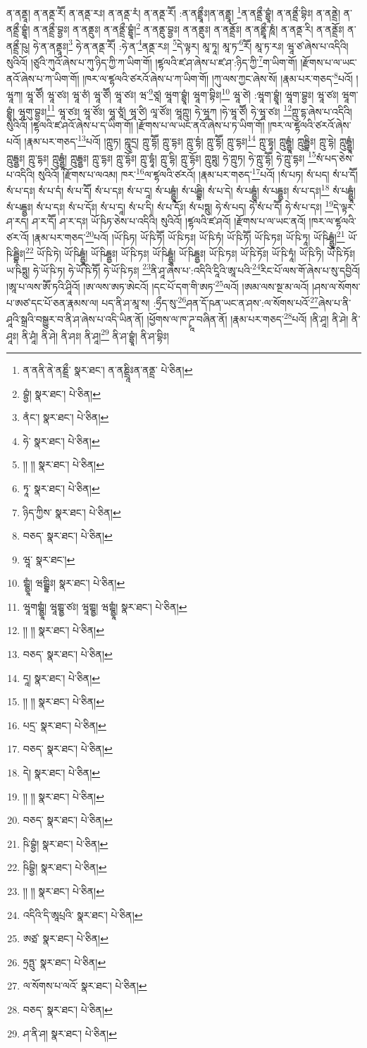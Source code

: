 ན་ནནྡཱ། ན་ནནྡ་རཽ། ན་ནནྡ་རཿ། ན་ནནྡ་རཾ། ན་ནནྡ་རཽ། :ན་ནནྡྲཱྀཿ།ན་ནནྡྲཱ། \footnote{ན་ནནི་ནེ་ནཎྡྲྀ་  སྣར་ཐང་། ན་ནཎྡྲཱིཿན་ནནྡྲ་  པེ་ཅིན། }ན་ནནྡྲྀ་བྷྱཱཾ། ན་ནནྡྲྀ་བྷིཿ། ན་ནནྡྲེ། ན་ནནྡྲྀ་བྷྱཱཾ། ན་ནནྡྲྀ་བྷྱཿ། ན་ནནྡུཿ། ན་ནནྡྲྀ་བྷྱཱཾ།\footnote{བྷྱཾ།  སྣར་ཐང་།  པེ་ཅིན། } ན་ནནྡུ་བྷྱཿ། ན་ནནྡུཿ། ན་ནནྡྲོཿ། ན་ནནྡྲཱྀ་ཎཱཾ། ན་ནནྡ་རི། ན་ནནྡྲོཿ། ན་ནནྡྲྀ་ཥུ། ཧེ་ན་ནནྡཱཿ།\footnote{ནཾང་།  སྣར་ཐང་།  པེ་ཅིན། } ཧེ་ན་ནནྡ་རཽ། :ཧེ་ན་\footnote{ཧེ་  སྣར་ཐང་།  པེ་ཅིན། }ནནྡ་རཿ། \footnote{།། །།  སྣར་ཐང་།  པེ་ཅིན། }དེ་ལྟར། མཱ་ཏཱ། མཱ་ཏ་\footnote{ཏཱ་  སྣར་ཐང་།  པེ་ཅིན། }རཽ། མཱ་ཏ་རཿ། ཝཱ་ཙ་ཞེས་པ་འདིའི། སུའིའོ། །ཙུའི་ཀུའོ་ཞེས་པ་ཀུ་ཉིད་ཀྱི་ཀ་ཡིག་གོ། །ཛྷལའི་ཛ་ཤ་ཞེས་པ་ཛ་ཤ་:ཉིད་ཀྱི་\footnote{ཉིད་ཀྱིས་  སྣར་ཐང་།  པེ་ཅིན། }ག་ཡིག་གོ། །རྫོགས་པ་ལ་ཡང་ནའོ་ཞེས་པ་ཀ་ཡིག་གོ། །ཁར་ལ་ཛྷལའི་ཙརའོ་ཞེས་པ་ཀ་ཡིག་གོ། །ཀུ་ལས་ཀྱང་ཞེས་སོ། །རྣམ་པར་གཅད་\footnote{བཅད་  སྣར་ཐང་།  པེ་ཅིན། }པའོ། །ཝཱཀ། ཝཱ་ཙཽ། ཝཱ་ཙཿ། ཝཱ་ཙཾ། ཝཱ་ཙཽ། ཝཱ་ཙཿ། ཝ་\footnote{ཝཱ་  སྣར་ཐང་། }ཙཱ། ཝཱག་བྷྱཱཾ། ཝཱག་བྷིཿ།\footnote{གྦྷྱཱཾ། ཝགྦྷིཿ།  སྣར་ཐང་།  པེ་ཅིན། } ཝཱ་ཙེ། :ཝཱག་བྷྱཱཾ། ཝཱག་བྷྱཿ། ཝཱ་ཙཿ། ཝཱག་བྷྱཱཾ། ཝཱགུ་བྷྱཿ།\footnote{ཝཱགགྦྷྱཱཾ། ཝཱགྦྷྱ་ཙཿ། ཝཱགྦྷྱ། ཝགྦྷྱཱཾ།  སྣར་ཐང་།  པེ་ཅིན། } ཝཱ་ཙཿ། ཝཱ་ཙོཿ། ཝཱ་ཙཱཾ། ཝཱ་ཙི། ལཱ་ཙོཿ། ཝཱཀྵུ། ཧེ་ཝཱཀ །ཧེ་ཝཱ་ཙཽ། ཧེ་ཝཱ་ཙཿ། \footnote{།། །།   སྣར་ཐང་།  པེ་ཅིན། }ཀྵུ་དྷ་ཞེས་པ་འདིའི། སུའིའོ། །ཛྷལའི་ཛ་ཤའོ་ཞེས་པ་ད་ཡིག་གོ། །རྫོགས་པ་ལ་ཡང་ནའོ་ཞེས་པ་ཏ་ཡིག་གོ། །ཁར་ལ་ཛྷལའི་ཙརའོ་ཞེས་པའོ། །རྣམ་པར་གཅད་\footnote{བཅད་  སྣར་ཐང་།  པེ་ཅིན། }པའོ། །ཀྵུཏ། ཀྵཱུདྲ། ཀྵུ་དྷཽ། ཀྵུ་དྷཿ། ཀྵུ་དྷཾ། ཀྵུ་དྷཽ། ཀྵུ་དྷཿ།\footnote{དཱ།  སྣར་ཐང་།  པེ་ཅིན། } ཀྵུ་དྷཱ། ཀྵུདྦྷྱཱཾ། ཀྵུདྦྷིཿ། ཀྵུ་དྷེ། ཀྵུདྦྷྱཱཾ། ཀྵུདྦྷྱཿ། ཀྵུ་དྷཿ། ཀྵུདྦྷྱཱཾ། ཀྵུདྦྷྱཿ། ཀྵུ་དྷཿ། ཀྵུ་དྷོཿ། ཀྵུ་དྷཱཾ། ཀྵུ་དྷི། ཀྵུ་དྷོཿ། ཀྵུཏྶུ། ཧེ་ཀྵུཏ། ཧེ་ཀྵུ་དྷཽ། ཧེ་ཀྵུ་དྷཿ། \footnote{།། །།   སྣར་ཐང་།  པེ་ཅིན། }སཾ་པད་ཅེས་པ་འདིའི། སུའིའོ། །རྫོགས་པ་ལའམ། ཁར་\footnote{པདྲ་  སྣར་ཐང་།  པེ་ཅིན། }ལ་ཛྷལའི་ཙརའོ། །རྣམ་པར་གཅད་\footnote{བཅད་  སྣར་ཐང་།  པེ་ཅིན། }པའོ། །སཾ་པཏ། སཾ་པད། སཾ་པ་དཽ། སཾ་པ་དཿ། སཾ་པ་དཾ། སཾ་པ་དཽ། སཾ་པ་དཿ། སཾ་པ་དཱ། སཾ་པདྦྷྱཱཾ། སཾ་པདྦྷི། སཾ་པ་དེ། སཾ་པདྦྷྱཱཾ། སཾ་པདྦྷྱཿ། སཾ་པ་དཿ།\footnote{དེ།  སྣར་ཐང་།  པེ་ཅིན། } སཾ་པདྦྷྱཱཾ། སཾ་པདྦྷྱཿ། སཾ་པ་དཿ། སཾ་པ་དོཿ། སཾ་པ་དཱ། སཾ་པ་དི། སཾ་པ་དོཿ། སཾ་པཏྶུ། ཧེ་སཾ་པད། ཧེ་སཾ་པ་དཽ། ཧེ་སཾ་པ་དཿ། \footnote{།། །།   སྣར་ཐང་།  པེ་ཅིན། }དེ་ལྟར་ཤ་རད། ཤ་ར་དཽ། ཤ་ར་དཿ། ཡོ་ཥིཏ་ཅེས་པ་འདིའི། སུའིའོ། །ཛྷལའི་ཛ་ཤའོ། །རྫོགས་པ་ལ་ཡང་ནའོ། །ཁར་ལ་ཛྷལའི་ཙར་འོ། །རྣམ་པར་གཅད་\footnote{བཅད་  སྣར་ཐང་།  པེ་ཅིན། }པའོ། །ཡོ་ཥིཏ། ཡོ་ཥི་ཏཽ། ཡོ་ཥི་ཏཿ། ཡོ་ཥི་ཏཾ། ཡོ་ཥི་ཏཽ། ཡོ་ཥི་ཏཿ། ཡོ་ཥི་ཏཱ། ཡོ་ཥིདྦྷྱཱཾ།\footnote{ཥི་བྷྱཾ།  སྣར་ཐང་།  པེ་ཅིན། } ཡོ་ཥི་དྦྷིཿ།\footnote{ཥིབྷྱི།  སྣར་ཐང་།  པེ་ཅིན། } ཡོ་ཥི་ཏེ། ཡོ་ཥིདྦྷྱཱཾ། ཡོ་ཥིདྦྷྱཿ། ཡོ་ཥི་ཏཿ། ཡོ་ཥིདྦྷྱཱཾ། ཡོ་ཥིདྦྷྱཿ། ཡོ་ཥི་ཏཿ། ཡོ་ཥི་ཏོཿ། ཡོ་ཥི་ཏཱཾ། ཡོ་ཥི་ཏི། ཡོ་ཥི་ཏོཿ། ཡ་ཥིཏྶུ། ཧེ་ཡོ་ཥི་ཏ། ཧེ་ཡོ་ཥི་ཏཽ། ཧེ་ཡོ་ཥི་ཏཿ། \footnote{།། །།   སྣར་ཐང་།  པེ་ཅིན། }ནི་ཤཱ་ཞེས་པ་:འདིའི་ངཱིའི་ཨཱ་པའི་\footnote{འདིའི་དི་ཨཱཔྲའི་  སྣར་ཐང་།  པེ་ཅིན། }རིང་པོ་ལས་གོ་ཞེས་པ་སུ་དབྱིའོ། །ཨཱ་པ་ལས་ཨཽ་ཏའི་ཤཱིའོ། །ཨ་ལས་ཨཏ་ཨེངའོ། །དང་པོ་དག་གི་ཨཏ་\footnote{ཨཙྲ་  སྣར་ཐང་།  པེ་ཅིན། }ལའོ། །ཨམ་ལས་སྔ་མ་ལའོ། །ཤས་ལ་སོགས་པ་ཨཙ་དང་པོ་ཅན་རྣམས་ལ། པད་ནི་ཤ་མཱ་ས། :ཧྲྀད་སུ་\footnote{ཧྲཏྤུ་  སྣར་ཐང་།  པེ་ཅིན། }ཤན་དོ་ཥན་ཡང་ན་ཤས་:ལ་སོགས་པའོ་\footnote{ལ་སོགས་པ་ལའོ་  སྣར་ཐང་།  པེ་ཅིན། }ཞེས་པ་ནི་ཤཱའི་སྒྲའི་བསྒྱུར་བ་ནི་ཤ་ཞེས་པ་འདི་ཡིན་ནོ། །ཕྱོགས་ལ་ཁ་ཌྭཱ་བཞིན་ནོ། །རྣམ་པར་གཅད་\footnote{བཅད་  སྣར་ཐང་།  པེ་ཅིན། }པའོ། །ནི་ཤཱ། ནི་ཤེ། ནི་ཤཱཿ། ནི་ཤཱཾ། ནི་ཤེ། ནི་ཤཿ། ནི་ཤཱ།\footnote{ཤ་ནི་ཤ།  སྣར་ཐང་།  པེ་ཅིན། } ནི་ཤ་བྷྱཱཾ། ནི་ཤ་བྷིཿ། 